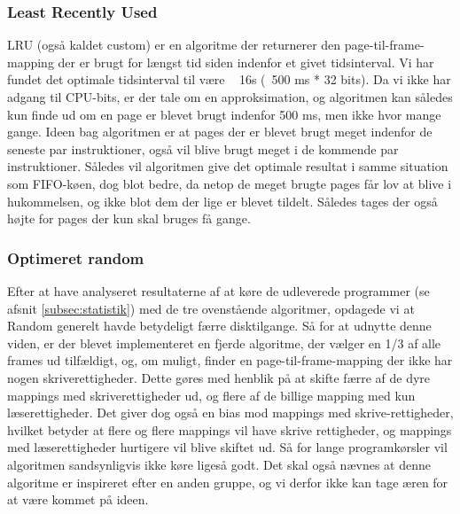 	\subsubsection{Least Recently Used}
	LRU (også kaldet custom) er en algoritme der returnerer den page-til-frame-mapping der er brugt for længst tid siden indenfor et givet tidsinterval.  Vi har fundet det optimale tidsinterval til være ~ 16s (~500 ms * 32 bits). Da vi ikke har adgang til CPU-bits, er der tale om en approksimation, og algoritmen kan således kun finde ud om en page er blevet brugt indenfor 500 ms, men ikke hvor mange gange. Ideen bag algoritmen er at pages der er blevet brugt meget indenfor de seneste par instruktioner, også vil blive brugt meget i de kommende par instruktioner. Således vil algoritmen give det optimale resultat i samme situation som FIFO-køen, dog blot bedre, da netop de meget brugte pages får lov at blive i hukommelsen, og ikke blot dem der lige er blevet tildelt. Således tages der også højte for pages der kun skal bruges få gange.
	\subsubsection{Optimeret random}
	Efter at have analyseret resultaterne af at køre de udleverede programmer (se afsnit \ref{subsec:statistik}) med de tre ovenstående algoritmer, opdagede vi at Random generelt havde betydeligt færre disktilgange. Så for at udnytte denne viden, er der blevet implementeret en fjerde algoritme, der vælger en 1/3 af alle frames ud tilfældigt, og, om muligt, finder en page-til-frame-mapping der ikke har nogen skriverettigheder. Dette gøres med henblik på at skifte færre af de dyre mappings med skriverettigheder ud, og flere af de billige mapping med kun læserettigheder. Det giver dog også en bias mod mappings med skrive-rettigheder, hvilket betyder at flere og flere mappings vil have skrive rettigheder, og mappings med læserettigheder hurtigere vil blive skiftet ud. Så for lange programkørsler vil algoritmen sandsynligvis ikke køre ligeså godt. Det skal også nævnes at denne algoritme er inspireret efter en anden gruppe, og vi derfor ikke kan tage æren for at være kommet på ideen. 

